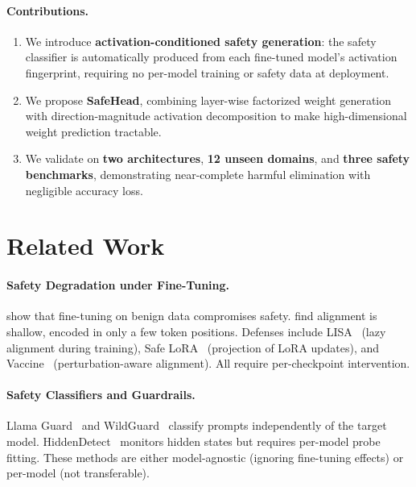 \documentclass[11pt]{article}
\newcommand{\method}{SafeHead}
\begin{document}
\paragraph{Contributions.}
\begin{enumerate}
    \item We introduce \textbf{activation-conditioned safety generation}: the safety classifier is automatically produced from each fine-tuned model's activation fingerprint, requiring no per-model training or safety data at deployment.
    \item We propose \textbf{\method{}}, combining layer-wise factorized weight generation with direction-magnitude activation decomposition to make high-dimensional weight prediction tractable.
    \item We validate on \textbf{two architectures}, \textbf{12 unseen domains}, and \textbf{three safety benchmarks}, demonstrating near-complete harmful elimination with negligible accuracy loss.
\end{enumerate}


\section{Related Work}
\label{sec:related}

\paragraph{Safety Degradation under Fine-Tuning.}
\citet{qi2024finetuning} show that fine-tuning on benign data compromises safety. \citet{qi2025tokensdeep} find alignment is shallow, encoded in only a few token positions. Defenses include LISA~\cite{huang2024lisa} (lazy alignment during training), Safe LoRA~\cite{hsu2024safe} (projection of LoRA updates), and Vaccine~\cite{yi2024vaccine} (perturbation-aware alignment). All require per-checkpoint intervention.

\paragraph{Safety Classifiers and Guardrails.}
Llama Guard~\cite{inan2023llama} and WildGuard~\cite{han2024wildguard} classify prompts independently of the target model.
HiddenDetect~\cite{jiang2025hiddendetect} monitors hidden states but requires per-model probe fitting.
These methods are either model-agnostic (ignoring fine-tuning effects) or per-model (not transferable).
\end{document}
